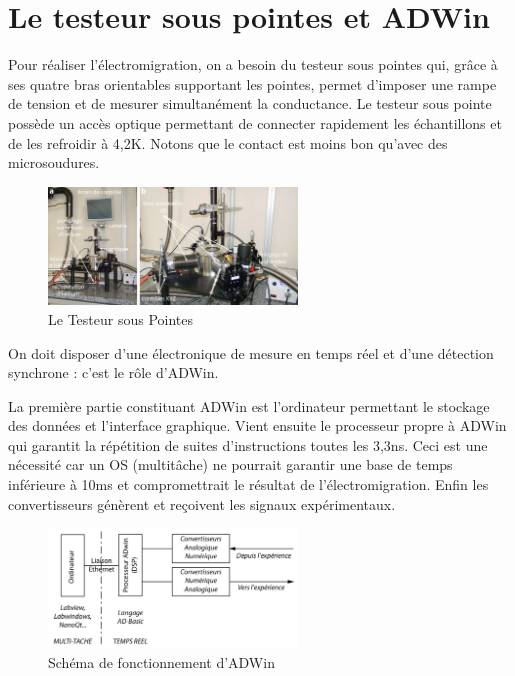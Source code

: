 \section{Le testeur sous pointes et ADWin}
Pour réaliser l'électromigration, on a besoin du testeur sous pointes qui, grâce à ses quatre bras orientables supportant les pointes, permet d'imposer une rampe de tension et de mesurer simultanément la conductance. Le testeur sous pointe possède un accès optique permettant de connecter rapidement les échantillons et de les refroidir à 4,2K. Notons que le contact est moins bon qu'avec des microsoudures.

\begin{figure}[h]
    \begin{center}
        \includegraphics[width=250px]{Images/2_ADWin_avec_legendes}
        \caption{Le Testeur sous Pointes}
    \end{center}
\end{figure}
On doit disposer d'une électronique de mesure en temps réel et d'une détection synchrone : c'est le rôle d'ADWin.

La première partie constituant ADWin est l'ordinateur permettant le stockage des données et l'interface graphique. Vient ensuite le processeur propre à ADWin qui garantit la répétition de suites d'instructions toutes les 3,3ns. Ceci est une nécessité car un OS (multitâche) ne pourrait garantir une base de temps inférieure à 10ms et compromettrait le résultat de l'électromigration. Enfin les convertisseurs génèrent et reçoivent les signaux expérimentaux.

\begin{figure}[h]
    \begin{center}
        \includegraphics[width=250px]{Images/2_ADWin_schema}
        \caption{Schéma de fonctionnement d'ADWin}
    \end{center}
\end{figure}


